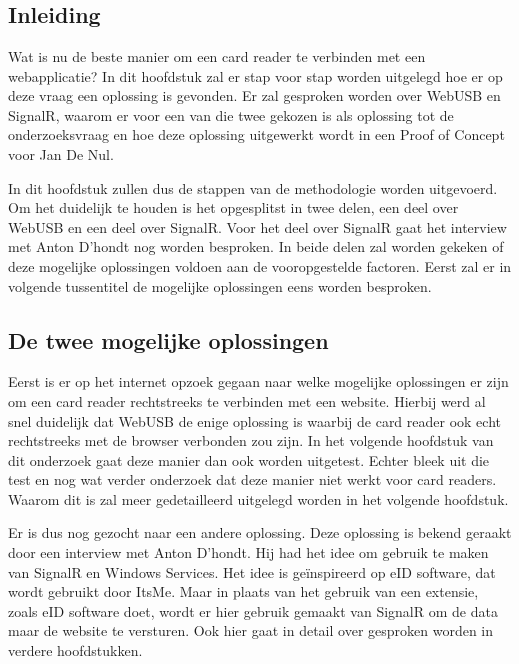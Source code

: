 \graphicspath{{graphics/}}
\chapter{}%
\label{ch:Onderzoek en Proof of Concept}
\section{Inleiding}
Wat is nu de beste manier om een card reader te verbinden met een webapplicatie? In dit hoofdstuk zal er stap voor stap worden uitgelegd hoe er op deze vraag een oplossing is gevonden. Er zal gesproken worden over WebUSB en SignalR, waarom er voor een van die twee gekozen is als oplossing tot de onderzoeksvraag en hoe deze oplossing uitgewerkt wordt in een Proof of Concept voor Jan De Nul.

In dit hoofdstuk zullen dus de stappen van de methodologie worden uitgevoerd. Om het duidelijk te houden is het opgesplitst in twee delen, een deel over WebUSB en een deel over SignalR. Voor het deel over SignalR gaat het interview met Anton D'hondt nog worden besproken. In beide delen zal worden gekeken of deze mogelijke oplossingen voldoen aan de vooropgestelde factoren. 
Eerst zal er in volgende tussentitel de mogelijke oplossingen eens worden besproken.


\section{De twee mogelijke oplossingen}
Eerst is er op het internet opzoek gegaan naar welke mogelijke oplossingen er zijn om een card reader rechtstreeks te verbinden met een website. Hierbij werd al snel duidelijk dat WebUSB de enige oplossing is waarbij de card reader ook echt rechtstreeks met de browser verbonden zou zijn. In het volgende hoofdstuk van dit onderzoek gaat deze manier dan ook worden uitgetest. Echter bleek uit die test en nog wat verder onderzoek dat deze manier niet werkt voor card readers. Waarom dit is zal meer gedetailleerd uitgelegd worden in het volgende hoofdstuk. 

Er is dus nog gezocht naar een andere oplossing. Deze oplossing is bekend geraakt door een interview met Anton D’hondt. Hij had het idee om gebruik te maken van SignalR en Windows Services. Het idee is geïnspireerd op eID software, dat wordt gebruikt door ItsMe. Maar in plaats van het gebruik van een extensie, zoals eID software doet, wordt er hier gebruik gemaakt van SignalR om de data maar de website te versturen. Ook hier gaat in detail over gesproken worden in verdere hoofdstukken. 




